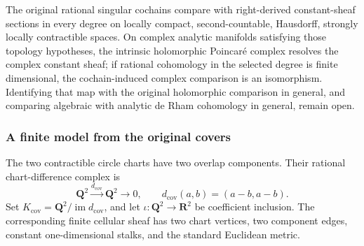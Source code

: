 \documentclass[11pt]{article}
\theoremstyle{definition}
\theoremstyle{remark}
\newcommand{\Q}{\mathbf Q}
\begin{document}
The original rational singular cochains compare with right-derived
constant-sheaf sections in every degree on locally compact, second-countable,
Hausdorff, strongly locally contractible spaces. On complex analytic
manifolds satisfying those topology hypotheses, the intrinsic holomorphic
Poincar\'e complex resolves the complex constant sheaf; if rational
cohomology in the selected degree is finite dimensional, the cochain-induced
complex comparison is an isomorphism.
Identifying that map with the original holomorphic comparison in general,
and comparing algebraic with analytic de Rham cohomology in general, remain
open.

\subsubsection*{A finite model from the original covers}

The two contractible circle charts have two overlap components. Their
rational chart-difference complex is
\[
 \Q^2\xrightarrow{d_{\mathrm{cov}}}\Q^2\longrightarrow0,
 \qquad d_{\mathrm{cov}}(a,b)=(a-b,a-b).
\]
Set \(K_{\mathrm{cov}}=\Q^2/\operatorname{im}d_{\mathrm{cov}}\), and let
\(\iota:\Q^2\to\mathbf R^2\) be coefficient inclusion. The corresponding
finite cellular sheaf has two chart vertices, two component edges, constant
one-dimensional stalks, and the standard Euclidean metric.
\end{document}
